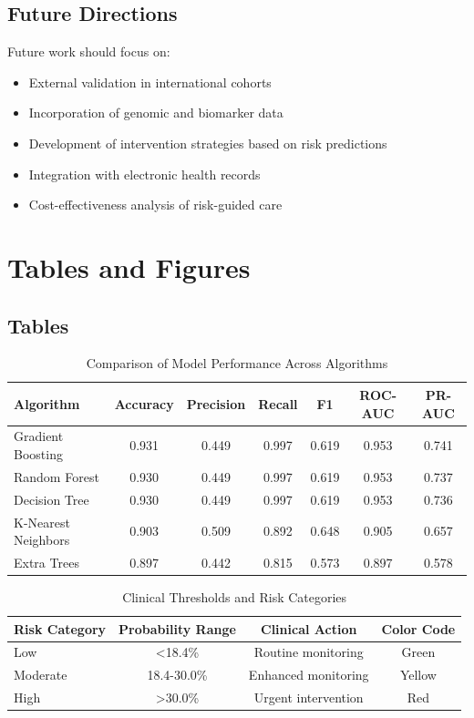 \documentclass[12pt,a4paper]{article}
\begin{document}
\subsection{Future Directions}

Future work should focus on:
\begin{itemize}
\item External validation in international cohorts
\item Incorporation of genomic and biomarker data
\item Development of intervention strategies based on risk predictions
\item Integration with electronic health records
\item Cost-effectiveness analysis of risk-guided care
\end{itemize}

\section{Tables and Figures}

\subsection{Tables}

\begin{table}[H]
\centering
\caption{Comparison of Model Performance Across Algorithms}
\label{tab:model_comparison}
\begin{tabular}{@{}lcccccc@{}}
\toprule
Algorithm & Accuracy & Precision & Recall & F1 & ROC-AUC & PR-AUC \\
\midrule
Gradient Boosting & 0.931 & 0.449 & 0.997 & 0.619 & 0.953 & 0.741 \\
Random Forest & 0.930 & 0.449 & 0.997 & 0.619 & 0.953 & 0.737 \\
Decision Tree & 0.930 & 0.449 & 0.997 & 0.619 & 0.953 & 0.736 \\
K-Nearest Neighbors & 0.903 & 0.509 & 0.892 & 0.648 & 0.905 & 0.657 \\
Extra Trees & 0.897 & 0.442 & 0.815 & 0.573 & 0.897 & 0.578 \\
\bottomrule
\end{tabular}
\end{table}

\begin{table}[H]
\centering
\caption{Clinical Thresholds and Risk Categories}
\label{tab:thresholds}
\begin{tabular}{@{}lccc@{}}
\toprule
Risk Category & Probability Range & Clinical Action & Color Code \\
\midrule
Low & <18.4\% & Routine monitoring & Green \\
Moderate & 18.4-30.0\% & Enhanced monitoring & Yellow \\
High & >30.0\% & Urgent intervention & Red \\
\bottomrule
\end{tabular}
\end{table}
\end{document}
